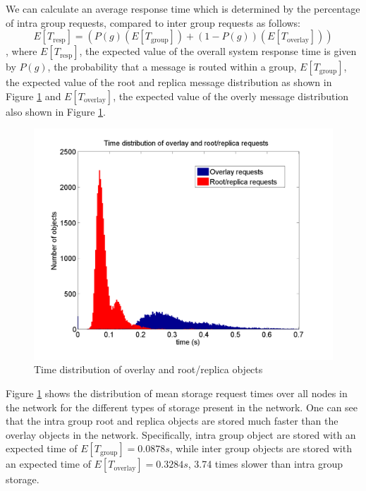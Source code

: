 \documentclass[10pt,a4paper,conference]{IEEEtran}
\begin{document}
We can calculate an average response time which is determined by the percentage of intra group requests, compared to inter group requests as follows:
%
\begin{equation}\label{expected_response_time}
    E[T_{\textrm{resp}}] = \left(P(g)\left(E\left[T_{\textrm{group}}\right]\right) + \left(1 - P(g)\right)\left(E\left[T_{\textrm{overlay}}\right]\right)\right)
\end{equation}
%
, where $E[T_{\textrm{resp}}]$, the expected value of the overall system response time is given by $P(g)$, the probability that a message is routed
within a group, $E\left[T_{\textrm{group}}\right]$, the expected value of the root and replica message distribution as shown in Figure
\ref{fig_pithos_response} and $E\left[T_{\textrm{overlay}}\right]$, the expected value of the overly message distribution also shown in Figure
\ref{fig_pithos_response}.

\begin{figure}[htbp]
 \centering
 \includegraphics[clip=true, viewport=1.5cm 1.3cm 25.5cm 19.7cm, width=\columnwidth]{request_time_distribution}
 \caption{Time distribution of overlay and root/replica objects}
 \label{fig_pithos_response}
\end{figure}
%
Figure \ref{fig_pithos_response} shows the distribution of mean storage request times over all nodes in the network for the different types of
storage present in the network. One can see that the intra group root and replica objects are stored much faster than the overlay objects in the
network. Specifically, intra group object are stored with an expected time of $E\left[T_{\textrm{group}}\right] =  0.0878 s$, while inter group
objects are stored with an expected time of $E\left[T_{\textrm{overlay}}\right] = 0.3284 s$, 3.74 times slower than intra group storage.
\end{document}
